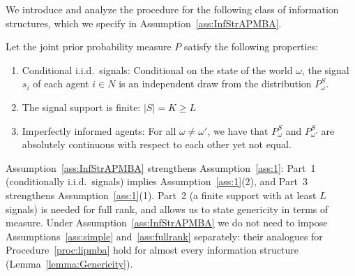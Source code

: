 \documentclass[12pt,reqno]{amsart}
\begin{document}
We introduce and analyze the procedure for the following class of information structures, which we specify in Assumption~\ref{ass:InfStrAPMBA}.
\par

\begin{assumption}\label{ass:InfStrAPMBA}
Let the joint prior probability measure $P$ satisfy the following properties:
    \begin{enumerate}
    \item Conditional i.i.d.\ signals: Conditional on the state of the world $\omega$, the signal $s_i$ of each agent $i \in N$ is an independent draw from the distribution $P_\omega^S$.
    \item The signal support is finite: $|S|=K\geq L$ 
    \item Imperfectly informed agents: For all $\omega \neq \omega'$, we have that $P_\omega^S$ and $P_{\omega'}^S$ are absolutely continuous with respect to each other yet not equal.
\end{enumerate}

\end{assumption}
Assumption~\ref{ass:InfStrAPMBA} strengthens Assumption~\ref{ass:1}: Part~1 (conditionally i.i.d.\ signals) implies Assumption~\ref{ass:1}(2), and Part~3 strengthens Assumption~\ref{ass:1}(1). Part~2 (a finite support with at least $L$ signals) is needed for full rank, and allows us to state genericity in terms of measure. Under Assumption~\ref{ass:InfStrAPMBA} we do not need to impose Assumptions~\ref{ass:simple} and~\ref{ass:fullrank} separately: their analogues for Procedure~\ref{proc:lipmba} hold for almost every information structure (Lemma~\ref{lemma:Genericity}).
\end{document}
